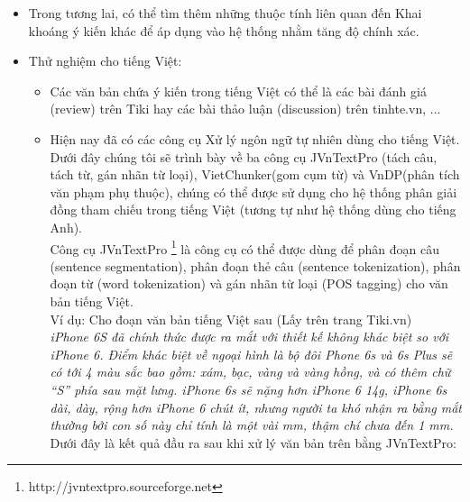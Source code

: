 \documentclass[12pt]{report}
\begin{document}
		\begin{itemize}
			\item{Trong tương lai, có thể tìm thêm những thuộc tính liên quan đến Khai khoáng ý kiến khác để áp dụng vào hệ thống nhằm tăng độ chính xác.}
			\item{Thử nghiệm cho tiếng Việt:
				\begin{itemize}
					\item{Các văn bản chứa ý kiến trong tiếng Việt có thể là các bài đánh giá (review) trên Tiki hay các bài thảo luận (discussion) trên tinhte.vn, ...
					}
					\item{Hiện nay đã có các công cụ Xử lý ngôn ngữ tự nhiên dùng cho tiếng Việt. Dưới đây chúng tôi sẽ trình bày về ba công cụ JVnTextPro (tách câu, tách từ, gán nhãn từ loại), VietChunker(gom cụm từ) và VnDP(phân tích văn phạm phụ thuộc), chúng có thể được sử dụng cho hệ thống phân giải đồng tham chiếu trong tiếng Việt (tương tự như hệ thống dùng cho tiếng Anh).					
					\\Công cụ JVnTextPro \footnote{http://jvntextpro.sourceforge.net} là công cụ có thể được dùng để phân đoạn câu (sentence segmentation), phân đoạn thẻ câu (sentence tokenization), phân đoạn từ (word tokenization) và gán nhãn từ loại (POS tagging) cho văn bản tiếng Việt.
					\\Ví dụ: Cho đoạn văn bản tiếng Việt sau (Lấy trên trang Tiki.vn)
					\\\textit{iPhone 6S đã chính thức được ra mắt với thiết kế không khác biệt so với iPhone 6. Điểm khác biệt về ngoại hình là bộ đôi Phone 6s và 6s Plus sẽ có tới 4 màu sắc bao gồm: xám, bạc, vàng và vàng hồng, và có thêm chữ “S” phía sau mặt lưng. iPhone 6s sẽ nặng hơn iPhone 6 14g, iPhone 6s dài, dày, rộng hơn iPhone 6 chút ít, nhưng người ta khó nhận ra bằng mắt thường bởi con số này chỉ tính là một vài mm, thậm chí chưa đến 1 mm.}
					\\Dưới đây là kết quả đầu ra sau khi xử lý văn bản trên bằng JVnTextPro:
					\begin{figure}[H]
						\centering				
						\noindent{}
\end{figure}}
\end{itemize}}
\end{itemize}
\end{document}
